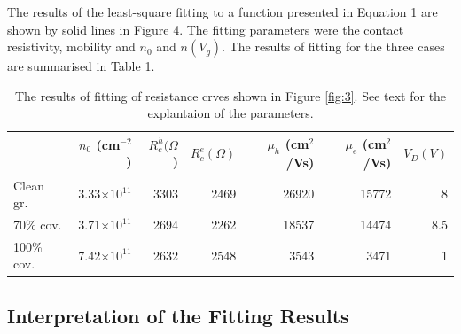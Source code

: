 \documentclass[preprint,aip,jap]{revtex4-2}
\begin{document}
\noindent The results of the least-square fitting to a function presented in Equation 1 are shown by solid lines in Figure 4. The fitting parameters were the contact resistivity, mobility and $n_0$ and $n(V_g)$.  The results of fitting for the three cases are summarised in Table 1.
\noindent \begin{table}[h]
  \centering
  \begin{tabular}{|l|r|r|r|r|r|r|} \hline%
   & $n_{0}$ (cm$^{-2}$ )& $R_{c}^{h}(\Omega$) & $R_{c}^{e}(\Omega)$ & $\mu_{h}$ (cm$^{2}$/Vs) & $\mu_{e}$ (cm$^{2}$/Vs) & $V_{D}(V) $  \\ \hline%
    Clean gr. & 3.33$\times 10^{11}$ & 3303 & 2469 & 26920 & 15772 & 8 \\
    70\% cov. &3.71$\times 10^{11}$ & 2694 & 2262 & 18537 & 14474 & 8.5 \\
     100\% cov. &7.42$\times 10^{11}$ & 2632 & 2548 & 3543 & 3471 & 1 \\ \hline
    
  \end{tabular}
  \caption{The results of fitting of resistance crves shown in Figure \ref{fig:3}. See  text for the explantaion of the parameters.}
  \label{tab:1}
\end{table}

\subsection{Interpretation of the Fitting Results}
\label{sec:interp}
\end{document}
